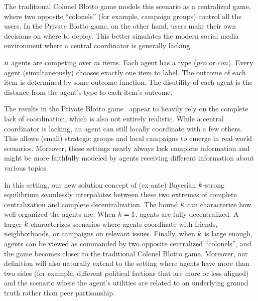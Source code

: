 The traditional Colonel Blotto game models this scenario as a centralized game, where two opposite ``colonels'' (for example, campaign groups) control all the users. In the Private Blotto game, on the other hand, users make their own decisions on where to deploy. This better simulates the modern social media environment where a central coordinator is generally lacking. 



\begin{definition} 
    $n$ agents are competing over $m$ items. Each agent has a type ($pro$ or $con$). Every agent (simultaneously) chooses exactly one item to label. The outcome of each item is determined by some outcome function. The disutility of each agent is the distance from the agent's type to each item's outcome. 
\end{definition}

The results in the Private Blotto game~\citep{donahue2023private} appear to heavily rely on the complete lack of coordination, which is also not entirely realistic. While a central coordinator is lacking, an agent can still locally coordinate with a few others. This allows (small) strategic groups and local campaigns to emerge in real-world scenarios. Moreover, these settings nearly always lack complete information and might be more faithfully modeled by agents receiving different information about various topics.   

In this setting, our new solution concept of (ex-ante) Bayesian $k$-strong equilibrium seamlessly interpolates between these two extremes of complete centralization and complete decentralization.  
The bound $k$ can characterize how well-organized the agents are. When $k = 1$, agents are fully decentralized. A larger $k$ characterizes scenarios where agents coordinate with friends, neighborhoods, or campaigns on relevant issues. Finally, when $k$ is large enough, agents can be viewed as commanded by two opposite centralized ``colonels'', and the game becomes closer to the traditional Colonel Blotto game. 
Moreover, our definition will also naturally extend to the setting where agents have more than two sides (for example, different political factions that are more or less aligned) and the scenario where the agent's utilities are related to an underlying ground truth rather than peer partisanship. 


